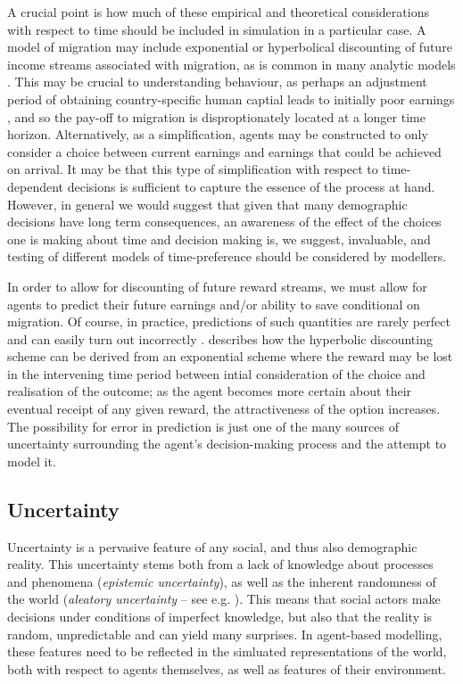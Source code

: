 \documentclass{article}
\begin{document}
A crucial point is how much of these empirical and theoretical considerations with respect to time should be included in simulation in a particular case. A model of migration may include exponential or hyperbolical discounting of future income streams associated with migration, as is common in many analytic models \citep{Carrington1996}. This may be crucial to understanding behaviour, as perhaps an adjustment period of obtaining country-specific human captial leads to initially poor earnings \citep{Dustmann2011}, and so the pay-off to migration is disproptionately located at a longer time horizon. Alternatively, as a simplification, agents may be constructed to only consider a choice between current earnings and earnings that could be achieved on arrival. It may be that this type of simplification with respect to time-dependent decisions is sufficient to capture the essence of the process at hand. However, in general we would suggest that given that many demographic decisions have long term consequences, an awareness of the effect of the choices one is making about time and decision making is, we suggest, invaluable, and testing of different models of time-preference should be considered by modellers. 

In order to allow for discounting of future reward streams, we must allow for agents to predict their future earnings and/or ability to save conditional on migration. Of course, in practice, predictions of such quantities are rarely perfect and can easily turn out incorrectly \citep{Dustmann1997}. \cite{Sozou1998} describes how the hyperbolic discounting scheme can be derived from an exponential scheme where the reward may be lost in the intervening time period between intial consideration of the choice and realisation of the outcome; as the agent becomes more certain about their eventual receipt of any given reward, the attractiveness of the option increases. The possibility for error in prediction is just one of the many sources of uncertainty surrounding the agent's decision-making process and the attempt to model it. 

\subsection{Uncertainty}

Uncertainty is a pervasive feature of any social, and thus also demographic reality. This uncertainty stems both from a lack of knowledge about processes and phenomena (\textit{epistemic uncertainty}), as well as the inherent randomness of the world (\textit{aleatory uncertainty} -- see e.g. \citeauthor{OHagan2004} \citeyear{OHagan2004}). This means that social actors make decisions under conditions of imperfect knowledge, but also that the reality is random, unpredictable and can yield many surprises. In agent-based modelling, these features need to be reflected in the simluated representations of the world, both with respect to agents themselves, as well as features of their environment. 
\end{document}
